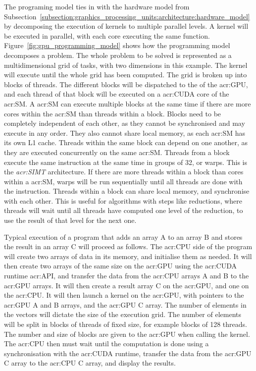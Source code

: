The programing model ties in with the hardware model from
Subsection~\ref{subsection:graphics_processing_units:architecture:hardware_model} by decomposing the
execution of kernels to multiple parallel levels. A kernel will be executed in parallel, with each
core executing the same function. Figure~\ref{fig:gpu_programming_model} shows how the programming
model decomposes a problem. The whole problem to be solved is represented as a multidimensional grid
of tasks, with two dimensions in this example. The kernel will execute until the whole grid has been
computed. The grid is broken up into blocks of threads. The different blocks will be dispatched to
the  of the \acrshort{acr:GPU}, and each thread of that block will be executed on
a \acrshort{acr:CUDA} core of the \acrshort{acr:SM}. A \acrshort{acr:SM} can execute multiple blocks
at the same time if there are more cores within the \acrshort{acr:SM} than threads within a block.
Blocks need to be completely independent of each other, as they cannot be synchronised and may
execute in any order. They also cannot share local memory, as each \acrshort{acr:SM} has its own L1
cache. Threads within the same block can depend on one another, as they are executed concurrently on
the same \acrshort{acr:SM}. Threads from a block execute the same instruction at the same time in
groups of 32, or warps. This is the \textit{\acrfull{acr:SIMT}} architecture. If there are more
threads within a block than cores within a \acrshort{acr:SM}, warps will be run sequentially until
all threads are done with the instruction. Threads within a block can share local memory, and
synchronise with each other. This is useful for algorithms with steps like reductions, where threads
will wait until all threads have computed one level of the reduction, to use the result of that
level for the next one.

Typical execution of a program that adds an array A to an array B and stores the result in an array
C will proceed as follows. The \acrshort{acr:CPU} side of the program will create two arrays of data
in its memory, and initialise them as needed. It will then create two arrays of the same size on the
\acrshort{acr:GPU} using the \acrshort{acr:CUDA} runtime \acrshort{acr:API}, and transfer the data
from the \acrshort{acr:CPU} arrays A and B to the \acrshort{acr:GPU} arrays. It will then create a
result array C on the \acrshort{acr:GPU}, and one on the \acrshort{acr:CPU}. It will then launch a
kernel on the \acrshort{acr:GPU}, with pointers to the \acrshort{acr:GPU} A and B arrays, and the
\acrshort{acr:GPU} C array. The number of elements in the vectors will dictate the size of the
execution grid. The number of elements will be split in blocks of threads of fixed size, for example
blocks of 128 threads. The number and size of blocks are given to the \acrshort{acr:GPU} when
calling the kernel. The \acrshort{acr:CPU} then must wait until the computation is done using a
synchronisation with the \acrshort{acr:CUDA} runtime, transfer the data from the \acrshort{acr:GPU}
C array to the \acrshort{acr:CPU} C array, and display the results. 

